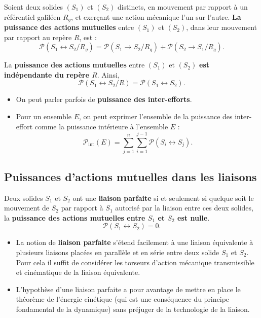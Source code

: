 \documentclass[10pt,fleqn]{article} %
\begin{document}
\begin{defi}
Soient deux solides $(S_1)$ et $(S_2)$ distincts, en mouvement par rapport à un référentiel galiléen $R_g$, et exerçant une action mécanique l'un sur l'autre.
\textbf{La puissance} \textbf{des actions mutuelles} entre $(S_1)$ et $(S_2)$, dans leur mouvement par rapport au repère $R$, est :
$$
\mathcal{P}(S_1 \leftrightarrow S_2/R_g)=\mathcal{P}(S_1 \rightarrow S_2/R_g)+\mathcal{P}(S_2 \rightarrow S_1/R_g).
$$		
 

La \textbf{puissance des actions mutuelles} entre $(S_1)$ et $(S_2)$ \textbf{est indépendante du repère $R$}.
Ainsi,
$$\mathcal{P}(S_1 \leftrightarrow S_2/R)=\mathcal{P}(S_1 \leftrightarrow S_2).
$$
\end{defi}


\begin{rem}%
\begin{itemize}
\item On peut parler parfois de \textbf{puissance des inter-efforts}.
\item Pour un ensemble $E$, on peut exprimer l'ensemble de la puissance des inter-effort comme la puissance intérieure à l'ensemble $E$ : 
$$
\mathcal{P}_{\text{int}}(E)=\displaystyle{\sum^n_{j=1}}\displaystyle{\sum^{j-1}_{i=1}}\mathcal{P}(S_i \leftrightarrow S_j).
$$
\end{itemize}

\end{rem}%


\subsection{Puissances d'actions mutuelles dans les liaisons}
\begin{defi}
Deux solides $S_1$ et $S_2$ ont une \textbf{liaison parfaite} si et seulement si quelque soit le mouvement de $S_2$ par rapport à $S_1$ autorisé par la liaison entre ces deux solides, la \textbf{puissance des actions mutuelles entre $S_1$ et $S_2$ est nulle}.
$$
\mathcal{P}(S_1 \leftrightarrow S_2)=0.
$$
\end{defi}


\begin{rem}%
\begin{itemize}
\item La notion de \textbf{liaison parfaite} s'étend facilement à une liaison équivalente à plusieurs liaisons placées en parallèle et en série entre deux solide $S_1$ et $S_2$. Pour cela il suffit de considérer les torseurs d'action mécanique transmissible et cinématique de la liaison équivalente.
\item L'hypothèse d'une liaison parfaite a pour avantage de mettre en place le théorème de l'énergie cinétique (qui est une conséquence du principe fondamental de la dynamique) sans préjuger de la technologie de la liaison.
\end{itemize}
\end{rem}%
\end{document}
